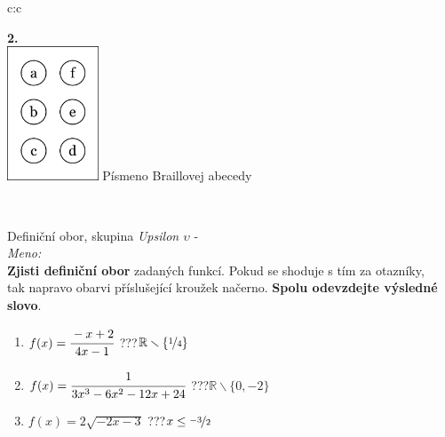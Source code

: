 \documentclass[10pt]{report}
\begin{document}
\begin{tabular}{c:c}
\begin{minipage}[c][99mm][t]{0.49\linewidth}
\begin{center}
\begin{minipage}{0.77\linewidth}
\begin{center}
\begin{varwidth}{\textwidth}
\begin{enumerate}
\end{enumerate}
\end{varwidth}
\end{center}
\end{minipage}
\begin{minipage}{0.20\linewidth}
\begin{center}
{\Huge\bfseries 2.} \\[2mm]
\includegraphics[height=40mm]{../images/braille.png}
{\small Písmeno Braillovej abecedy}
\end{center}
\end{minipage}
\end{center}
\end{minipage}
\\ \hdashline
\begin{minipage}[c][99mm][t]{0.49\linewidth}
\begin{center}
\vspace{7mm}
{\huge Definiční obor, skupina \textit{Upsilon $\upsilon$} -}\\[4.5mm]
\textit{Meno:}\phantom{xxxxxxxxxxxxxxxxxxxxxxxxxxxxxxxxxxxxxxxxxxxxxxxxxxxxxxxxxxxxxxxxx}\\[3.5mm]
\textbf{Zjisti definiční obor} zadaných funkcí. Pokud se shoduje s tím za otazníky,\\tak napravo obarvi příslušející kroužek načerno. \textbf{Spolu odevzdejte výsledné slovo}.\\[3mm]
\begin{minipage}{0.77\linewidth}
\begin{center}
\begin{varwidth}{\textwidth}
\begin{enumerate}
\normalsize
\item $f(x)=\cfrac{-x+2}{4x-1}$\quad \dotfill\; ???\;\dotfill \quad $\mathbb{R}\smallsetminus\{\nicefrac{1}{4}\}$
\item $f(x)=\cfrac{1}{3x^3-6x^2-12x+24}$\quad \dotfill\; ???\;\dotfill \quad $\mathbb{R}\smallsetminus\{0,-2\}$
\item $f(x)=2\sqrt{-2x-3}$\quad \dotfill\; ???\;\dotfill \quad $x\leq\nicefrac{-3}{2}$

\end{enumerate}
\end{varwidth}
\end{center}
\end{minipage}
\end{center}
\end{minipage}
\end{tabular}
\end{document}
